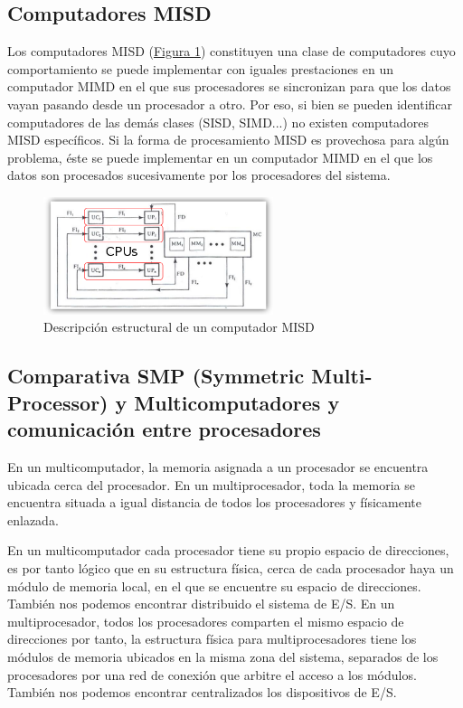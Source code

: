 \documentclass[10pt,a4paper,spanish]{report}
\begin{document}
\textcolor[rgb]{0.2,0.4,0.8}{\subsection{Computadores MISD}}
Los computadores MISD (\hyperref[misd]{Figura \ref*{misd}}) constituyen una clase de computadores cuyo comportamiento se puede implementar con iguales prestaciones en un computador MIMD en el que sus procesadores se sincronizan para que los datos vayan pasando desde un procesador a otro. Por eso, si bien se pueden identificar computadores de las demás clases (SISD, SIMD...) no existen computadores MISD específicos. Si la forma de procesamiento MISD es provechosa para algún problema, éste se puede implementar en un computador MIMD en el que los datos son procesados sucesivamente por los procesadores del sistema.

\begin{figure}[!h]
\centering
\includegraphics[width=0.6\textwidth]{18}
\caption{Descripción estructural de un computador MISD}
\label{misd}
\end{figure}

\textcolor[rgb]{0.2,0.4,0.8}{\subsection{Comparativa SMP (Symmetric Multi-Processor) y Multicomputadores y comunicación entre procesadores}}
En un multicomputador, la memoria asignada a un procesador se encuentra ubicada cerca del procesador. En un multiprocesador, toda la memoria se encuentra situada a igual distancia de todos los procesadores y físicamente enlazada. 

En un multicomputador cada procesador tiene su propio espacio de direcciones, es por tanto lógico que en su estructura física, cerca de cada procesador haya un módulo de memoria local, en el que se encuentre su espacio de direcciones. También nos podemos encontrar distribuido el sistema de E/S. En un multiprocesador, todos los procesadores comparten el mismo espacio de direcciones por tanto, la estructura física para multiprocesadores tiene los módulos de memoria ubicados en la misma zona del sistema, separados de los procesadores por una red de conexión que arbitre el acceso a los módulos. También nos podemos encontrar centralizados los dispositivos de E/S. 
\end{document}
